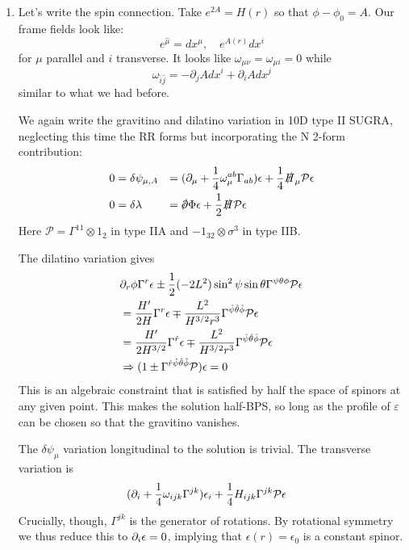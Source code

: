 \documentclass[11pt, class=article, crop=false]{standalone}
\begin{document}
\begin{enumerate}
	\item Let's write the spin connection. Take $e^{2A} = H(r)$ so that $\phi - \phi_0 = A$. Our frame fields look like:
	\[
		e^{\hat \mu} = dx^\mu, \quad e^{A(r)} dx^i
	\]
	for $\mu$ parallel and $i$ transverse. It looks like $\omega_{\mu \nu} = \omega_{\mu i} = 0$ while 
	\[
		\omega_{\hat i \hat j} = - \partial_j A dx^i + \partial_i A dx^j
	\]
	similar to what we had before.
	
	We again write the gravitino and dilatino variation in 10D type II SUGRA, neglecting this time the RR forms but incorporating the N 2-form contribution: 
	\[
	\begin{aligned}
		0 &=
		 \delta \psi_{\mu, A} & = & \; (\d_\mu + \frac14 \omega_{\mu}^{ab} \Gamma_{ab}) \epsilon + \frac14 \slashed{H}_\mu \mathcal P \epsilon \\
		0 &= \delta \lambda & =& \; \slashed{\d} \Phi \epsilon  + \frac12 \slashed{H} \mathcal P \epsilon
	\end{aligned}
	\]
	Here $\mathcal P  = \Gamma^{11} \otimes 1_2$ in type IIA and $-1_{32} \otimes \sigma^{3}$ in type IIB. 
	
	The dilatino variation gives
	\[
	\begin{aligned}
		& \partial_r \phi \Gamma^r \epsilon \pm \frac12 (-2 L^2) \sin^2 \psi \sin \theta \Gamma^{ \psi \theta \phi} \mathcal P \epsilon \\
		&= \frac{H'}{2 H} \Gamma^r \epsilon \mp \frac{L^2}{H^{3/2} r^3} \Gamma^{ \hat \psi \hat \theta \hat \phi} \mathcal P \epsilon\\
		&= \frac{H'}{2 H^{3/2}} \Gamma^{\hat r} \epsilon \mp \frac{L^2}{H^{3/2} r^3} \Gamma^{ \hat \psi \hat \theta \hat \phi} \mathcal P \epsilon\\
		&\Rightarrow (1  \pm  \Gamma^{\hat r \hat \psi \hat \theta \hat \phi} \mathcal P)  \epsilon = 0
	\end{aligned}
	\]
	This is an algebraic constraint that is satisfied by half the space of spinors at any given point. This makes the solution half-BPS, so long as the profile of $\varepsilon$ can be chosen so that the gravitino vanishes.
	
	The $\delta \psi_\mu$ variation longitudinal to the solution is trivial. The transverse variation is
	\[
	\begin{aligned}
		& (\partial_i + \frac14 \omega_{i j k} \Gamma^{jk}) \epsilon_i + \frac14 H_{i j k} \Gamma^{j k} \mathcal P \epsilon
	\end{aligned}
	\]
	Crucially, though, $\Gamma^{jk}$ is the generator of rotations. By rotational symmetry we thus reduce this to $\partial_i \epsilon = 0$, implying that $\epsilon(r) = \epsilon_0$ is a constant spinor.
	

\end{enumerate}
\end{document}
